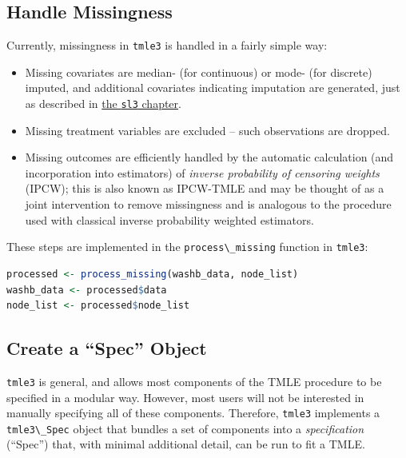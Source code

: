 \documentclass[
  12pt, krantz2,
]{krantz}
\newcommand{\passthrough}[1]{#1}
\providecommand{\tightlist}{%
  \setlength{\itemsep}{0pt}\setlength{\parskip}{0pt}}
\newcommand{\1}{\mathbbm{1}}
\theoremstyle{definition}
\theoremstyle{definition}
\theoremstyle{definition}
\theoremstyle{definition}
\theoremstyle{remark}
\begin{document}
\hypertarget{handle-missingness}{%
\subsection{Handle Missingness}\label{handle-missingness}}

Currently, missingness in \passthrough{\lstinline!tmle3!} is handled in a fairly simple way:

\begin{itemize}
\tightlist
\item
  Missing covariates are median- (for continuous) or mode- (for discrete)
  imputed, and additional covariates indicating imputation are generated, just
  as described in \protect\hyperlink{sl3}{the \passthrough{\lstinline!sl3!} chapter}.
\item
  Missing treatment variables are excluded -- such observations are dropped.
\item
  Missing outcomes are efficiently handled by the automatic calculation (and
  incorporation into estimators) of \emph{inverse probability of censoring weights}
  (IPCW); this is also known as IPCW-TMLE and may be thought of as a joint
  intervention to remove missingness and is analogous to the procedure used with
  classical inverse probability weighted estimators.
\end{itemize}

These steps are implemented in the \passthrough{\lstinline!process\_missing!} function in \passthrough{\lstinline!tmle3!}:

\begin{lstlisting}[language=R]
processed <- process_missing(washb_data, node_list)
washb_data <- processed$data
node_list <- processed$node_list
\end{lstlisting}

\hypertarget{create-a-spec-object}{%
\subsection{Create a ``Spec'' Object}\label{create-a-spec-object}}

\passthrough{\lstinline!tmle3!} is general, and allows most components of the TMLE procedure to be
specified in a modular way. However, most users will not be interested in
manually specifying all of these components. Therefore, \passthrough{\lstinline!tmle3!} implements a
\passthrough{\lstinline!tmle3\_Spec!} object that bundles a set of components into a \emph{specification}
(``Spec'') that, with minimal additional detail, can be run to fit a TMLE.
\end{document}
